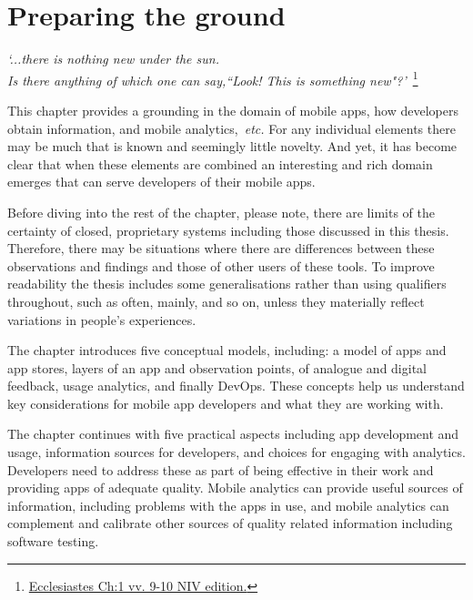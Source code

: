 \setcounter{mtc}{5}


\chapter{Preparing the ground}
\emph{`...there is nothing new under the sun. \\Is there anything of which one can say,``Look! This is something new"?'}~\footnote{\href{https://www.biblegateway.com/passage/?search=Ecclesiastes+1\%3A9-10&version=NIV}{Ecclesiastes Ch:1 vv. 9-10 NIV edition.}}

\vspace{10mm}

This chapter provides a grounding in the domain of mobile apps, how developers obtain information, and mobile analytics,~\emph{etc.}  For any individual elements there may be much that is known and seemingly little novelty. And yet, it has become clear that when these elements are combined an interesting and rich domain emerges that can serve developers of their mobile apps.

Before diving into the rest of the chapter, please note, 
there are limits of the certainty of closed, proprietary systems including those discussed in this thesis. Therefore, there may be situations where there are differences between these observations and findings and those of other users of these tools. To improve readability the thesis includes some generalisations rather than using qualifiers throughout, such as often, mainly, and so on, unless they materially reflect variations in people's experiences.

The chapter introduces five conceptual models, including: a model of apps and app stores, layers of an app and observation points, of analogue and digital feedback, usage analytics, and finally DevOps. These concepts help us understand key considerations for mobile app developers and what they are working with.

The chapter continues with five practical aspects including app development and usage, information sources for developers, and choices for engaging with analytics. Developers need to address these as part of being effective in their work and providing apps of adequate quality. Mobile analytics can provide useful sources of information, including problems with the apps in use, and mobile analytics can complement and calibrate other sources of quality related information including software testing. 

